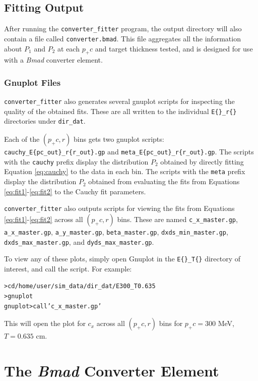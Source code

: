 \documentclass[12pt]{article}
\newcommand{\exef}{\texttt{converter\_fitter}\xspace}
\newcommand{\bmad}{\textit{Bmad}\xspace}
\newenvironment{example}
  {\vspace{-2.6ex} \begin{alltt}}
  {\end{alltt} \vspace{-2.3ex}}
\begin{document}
\subsection{Fitting Output}

After running the \exef program, the output directory will also contain a file called
\texttt{converter.bmad}.  This file aggregates all the information about $P_1$ and $P_2$ at each
$p_+ c$ and target thickness tested, and is designed for use with a \bmad converter element.

\subsubsection{Gnuplot Files}

\exef  also generates several gnuplot scripts for inspecting the quality of the obtained fits.
These are all written to the individual \texttt{E\{\}\_r\{\}} directories under \texttt{dir\_dat}.

Each of the $(p_+ c, r)$ bins gets two gnuplot scripts:
\texttt{cauchy\_E\{pc\_out\}\_r\{r\_out\}.gp} and \texttt{meta\_E\{pc\_out\}\_r\{r\_out\}.gp}.  The
scripts with the \texttt{cauchy} prefix display the distribution $P_2$ obtained by directly fitting
Equation \ref{eq:cauchy} to the data in each bin.  The scripts with the \texttt{meta} prefix display
the distribution $P_2$ obtained from evaluating the fits from Equations \ref{eq:fit1}-\ref{eq:fit2}
to the Cauchy fit parameters.

\exef also outputs scripts for viewing the fits from Equations \ref{eq:fit1}-\ref{eq:fit2} across
all $(p_+ c, r)$ bins.  These are named \texttt{c\_x\_master.gp}, \texttt{a\_x\_master.gp},
\texttt{a\_y\_master.gp}, \texttt{beta\_master.gp}, \texttt{dxds\_min\_master.gp},
\texttt{dxds\_max\_master.gp}, and \texttt{dyds\_max\_master.gp}.

To view any of these plots, simply open Gnuplot in the \texttt{E\{\}\_T\{\}} directory of interest,
and call the script.  For example:
\begin{example}
  > cd /home/user/sim_data/dir_dat/E300_T0.635
  > gnuplot
  gnuplot> call 'c_x_master.gp'
\end{example}
This will open the plot for $c_x$ across all $(p_+ c, r)$ bins for $p_+ c = 300$ MeV, $T = 0.635$ cm.

\newpage
\section{The \bmad  Converter Element}
\end{document}
